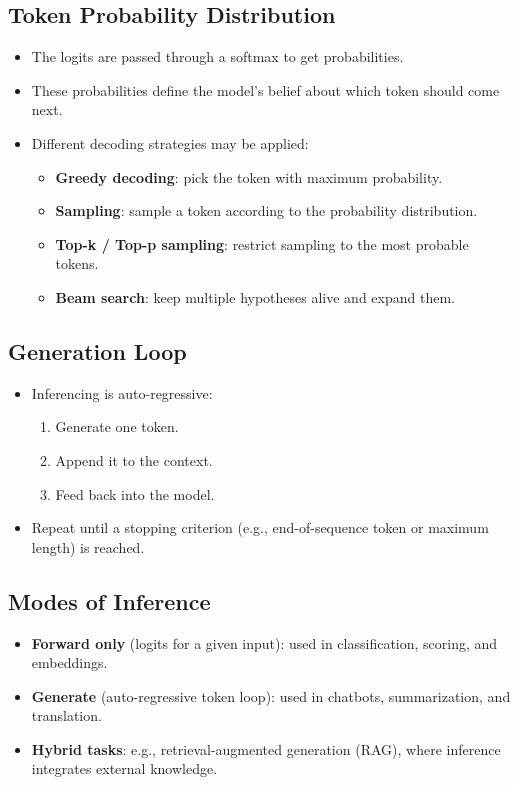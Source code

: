 \subsection{Token Probability Distribution}
\begin{itemize}
    \item The logits are passed through a softmax to get probabilities.
    \item These probabilities define the model's belief about which token should come next.
    \item Different decoding strategies may be applied:
    \begin{itemize}
        \item \textbf{Greedy decoding}: pick the token with maximum probability.
        \item \textbf{Sampling}: sample a token according to the probability distribution.
        \item \textbf{Top-k / Top-p sampling}: restrict sampling to the most probable tokens.
        \item \textbf{Beam search}: keep multiple hypotheses alive and expand them.
    \end{itemize}
\end{itemize}

\subsection{Generation Loop}
\begin{itemize}
    \item Inferencing is auto-regressive:
    \begin{enumerate}
        \item Generate one token.
        \item Append it to the context.
        \item Feed back into the model.
    \end{enumerate}
    \item Repeat until a stopping criterion (e.g., end-of-sequence token or maximum length) is reached.
\end{itemize}

\subsection{Modes of Inference}
\begin{itemize}
    \item \textbf{Forward only} (logits for a given input): used in classification, scoring, and embeddings.
    \item \textbf{Generate} (auto-regressive token loop): used in chatbots, summarization, and translation.
    \item \textbf{Hybrid tasks}: e.g., retrieval-augmented generation (RAG), where inference integrates external knowledge.
\end{itemize}

